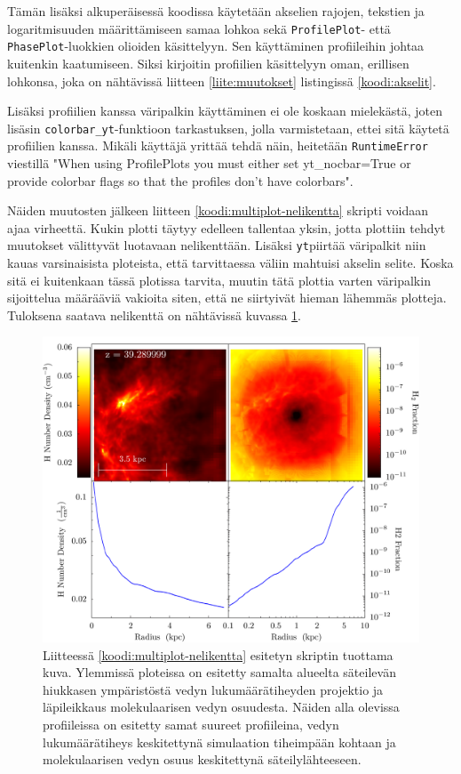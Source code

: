 \documentclass[12pt,a4paper]{article}
\newcommand{\yt}{\texttt{yt}}
\begin{document}
Tämän lisäksi alkuperäisessä koodissa käytetään akselien rajojen, tekstien ja logaritmisuuden määrittämiseen samaa lohkoa sekä \texttt{ProfilePlot}- että \texttt{PhasePlot}-luokkien olioiden käsittelyyn. Sen käyttäminen profiileihin johtaa kuitenkin kaatumiseen. Siksi kirjoitin profiilien käsittelyyn oman, erillisen lohkonsa, joka on nähtävissä liitteen \ref{liite:muutokset} listingissä \ref{koodi:akselit}.

Lisäksi profiilien kanssa väripalkin käyttäminen ei ole koskaan mielekästä, joten lisäsin \texttt{colorbar\_yt}-funktioon tarkastuksen, jolla varmistetaan, ettei sitä käytetä profiilien kanssa. Mikäli käyttäjä yrittää tehdä näin, heitetään \texttt{RuntimeError} viestillä "When using ProfilePlots you must either set yt\_nocbar=True or provide colorbar flags so that the profiles don't have colorbars".

Näiden muutosten jälkeen liitteen \ref{koodi:multiplot-nelikentta} skripti voidaan ajaa virheettä. Kukin plotti täytyy edelleen tallentaa yksin, jotta plottiin tehdyt muutokset välittyvät luotavaan nelikenttään. Lisäksi \yt piirtää väripalkit niin kauas varsinaisista ploteista, että tarvittaessa väliin mahtuisi akselin selite. Koska sitä ei kuitenkaan tässä plotissa tarvita, muutin tätä plottia varten väripalkin sijoittelua määrääviä vakioita siten, että ne siirtyivät hieman lähemmäs plotteja. Tuloksena saatava nelikenttä on nähtävissä kuvassa \ref{fig:nelikentta}.

\begin{figure}
   \centering
   \includegraphics[width=\textwidth]{../kuvat/nelikko.png}
   \caption{Liitteessä \ref{koodi:multiplot-nelikentta} esitetyn skriptin tuottama kuva. Ylemmissä ploteissa on esitetty samalta alueelta säteilevän hiukkasen ympäristöstä vedyn lukumäärätiheyden projektio ja läpileikkaus molekulaarisen vedyn osuudesta. Näiden alla olevissa profiileissa on esitetty samat suureet profiileina, vedyn lukumäärätiheys keskitettynä simulaation tiheimpään kohtaan ja molekulaarisen vedyn osuus keskitettynä säteilylähteeseen.} \label{fig:nelikentta}
\end{figure}
\end{document}
